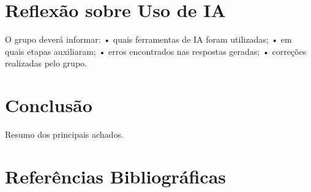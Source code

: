 \documentclass{article}
\begin{document}
\newpage

\section{Reflexão sobre Uso de IA}
O grupo deverá informar:
• quais ferramentas de IA foram utilizadas;
• em quais etapas auxiliaram;
• erros encontrados nas respostas geradas;
• correções realizadas pelo grupo.

\newpage

\section{Conclusão}
Resumo dos principais achados.

\newpage

\section{Referências Bibliográficas}
\end{document}
